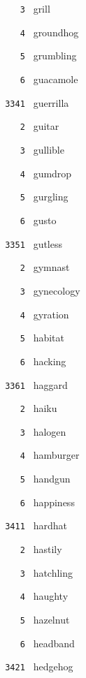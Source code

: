 \documentclass[11pt]{article}
\begin{document}
\begin{multicols}{6}
\noindent \texttt{ \ \ \ 3 } grill  \par
\noindent \texttt{ \ \ \ 4 } groundhog  \par
\noindent \texttt{ \ \ \ 5 } grumbling  \par
\noindent \texttt{ \ \ \ 6 } guacamole  \par
\vspace{3mm}
\noindent \texttt{ 3341 } guerrilla  \par
\noindent \texttt{ \ \ \ 2 } guitar  \par
\noindent \texttt{ \ \ \ 3 } gullible  \par
\noindent \texttt{ \ \ \ 4 } gumdrop  \par
\noindent \texttt{ \ \ \ 5 } gurgling  \par
\noindent \texttt{ \ \ \ 6 } gusto  \par
\vspace{3mm}
\noindent \texttt{ 3351 } gutless  \par
\noindent \texttt{ \ \ \ 2 } gymnast  \par
\noindent \texttt{ \ \ \ 3 } gynecology  \par
\noindent \texttt{ \ \ \ 4 } gyration  \par
\noindent \texttt{ \ \ \ 5 } habitat  \par
\noindent \texttt{ \ \ \ 6 } hacking  \par
\vspace{3mm}
\noindent \texttt{ 3361 } haggard  \par
\noindent \texttt{ \ \ \ 2 } haiku  \par
\noindent \texttt{ \ \ \ 3 } halogen  \par
\noindent \texttt{ \ \ \ 4 } hamburger  \par
\noindent \texttt{ \ \ \ 5 } handgun  \par
\noindent \texttt{ \ \ \ 6 } happiness  \par
\noindent \texttt{ 3411 } hardhat  \par
\noindent \texttt{ \ \ \ 2 } hastily  \par
\noindent \texttt{ \ \ \ 3 } hatchling  \par
\noindent \texttt{ \ \ \ 4 } haughty  \par
\noindent \texttt{ \ \ \ 5 } hazelnut  \par
\noindent \texttt{ \ \ \ 6 } headband  \par
\vspace{3mm}
\noindent \texttt{ 3421 } hedgehog  \par

\end{multicols}
\end{document}
